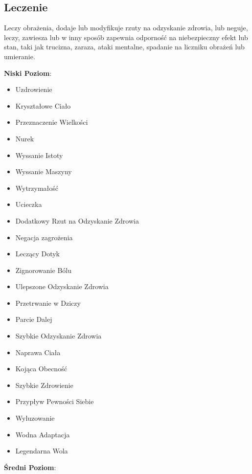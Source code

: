 \subsection{Leczenie}

Leczy obrażenia, dodaje lub modyfikuje rzuty na odzyskanie zdrowia, lub neguje, leczy, zawiesza lub w inny sposób zapewnia odporność na niebezpieczny efekt lub stan, taki jak trucizna, zaraza, ataki mentalne, spadanie na liczniku obrażeń lub umieranie.

\textbf{Niski Poziom}:

\begin{itemize}
\item Uzdrowienie
\item Kryształowe Ciało
\item Przeznaczenie Wielkości
\item Nurek
\item Wyssanie Istoty
\item Wyssanie Maszyny
\item Wytrzymałość
\item Ucieczka
\item Dodatkowy Rzut na Odzyskanie Zdrowia
\item Negacja zagrożenia
\item Leczący Dotyk
\item Zignorowanie Bólu
\item Ulepszone Odzyskanie Zdrowia
\item Przetrwanie w Dziczy
\item Parcie Dalej
\item Szybkie Odzyskanie Zdrowia
\item Naprawa Ciała
\item Kojąca Obecność
\item Szybkie Zdrowienie
\item Przypływ Pewności Siebie
\item Wyluzowanie
\item Wodna Adaptacja
\item Legendarna Wola
\end{itemize}

\textbf{Średni Poziom}:

